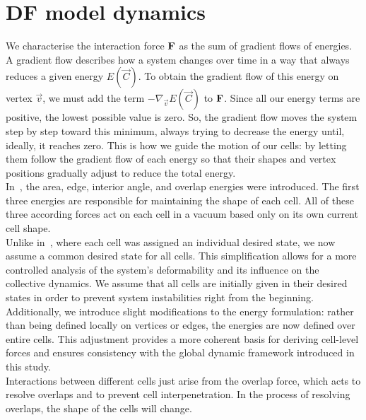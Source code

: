 \section{DF model dynamics} 
We characterise the interaction force $\mathbf{F}$ as the sum of gradient flows of energies. \\
A gradient flow describes how a system changes over time in a way that always reduces a given energy $E(\vec{C})$.
To obtain the gradient flow of this energy on vertex $\vec{v}$, we must add the term $-\nabla_{\vec{v}} E(\vec{C})$ to $\mathbf{F}$.
Since all our energy terms are positive, the lowest possible value is zero.  
So, the gradient flow moves the system step by step toward this minimum, always trying to decrease the energy until, ideally, it reaches zero. 
This is how we guide the motion of our cells: by letting them follow the gradient flow of each energy so that their shapes and vertex positions gradually adjust to reduce the total energy. \\
In~\cite{Vogel2023}, the area, edge, interior angle, and overlap energies were introduced.
The first three energies are responsible for maintaining the shape of each cell. 
All of these three according forces act on each cell in a vacuum based only on its own current cell shape. \\
Unlike in~\cite{Vogel2023}, where each cell was assigned an individual desired state, we now assume a common desired state for all cells. This simplification allows for a more controlled analysis of the system's deformability and its influence on the collective dynamics.
We assume that all cells are initially given in their desired states in order to prevent system instabilities right from the beginning. \\
Additionally, we introduce slight modifications to the energy formulation: rather than being defined locally on vertices or edges, the energies are now defined over entire cells. 
This adjustment provides a more coherent basis for deriving cell-level forces and ensures consistency with the global dynamic framework introduced in this study. \\
Interactions between different cells just arise from the overlap force, which acts to resolve overlaps and to prevent cell interpenetration. 
In the process of resolving overlaps, the shape of the cells will change.  

